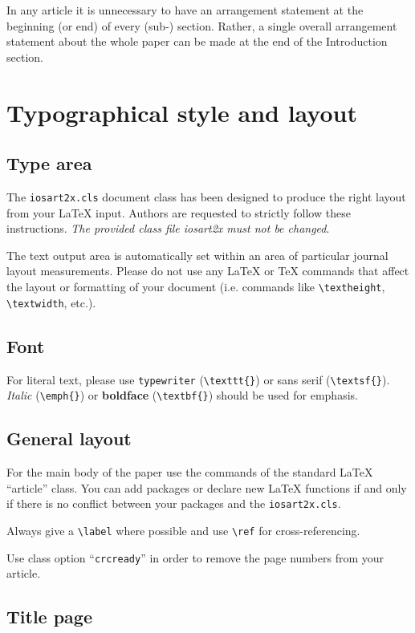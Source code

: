 \documentclass[ds]{iosart2x}
\begin{document}
In any article it is unnecessary to have an arrangement statement at the beginning (or end) of every \mbox{(sub-)} section.
Rather, a single overall arrangement statement about the whole paper can be made at the end of the Introduction section.


\section{Typographical style and layout}

\subsection{Type area}

The \texttt{iosart2x.cls} document class has been designed to produce
the right layout from your \LaTeX{} input. Authors are requested to
strictly follow these instructions. \emph{The provided class file
iosart2x must not be changed}.

The text output area is automatically set within an area of particular journal layout measurements.
Please do not use any
\LaTeX{} or \TeX{} commands that affect the layout or formatting of
your document (i.e. commands like \verb|\textheight|,
\verb|\textwidth|, etc.).

\subsection{Font}

For literal text, please use
\texttt{type\-writer} (\verb|\texttt{}|)
or \textsf{sans serif} (\verb|\textsf{}|). \emph{Italic} (\verb|\emph{}|)
or \textbf{boldface} (\verb|\textbf{}|) should be used for emphasis.


\subsection{General layout}

For the main
body of the paper use the commands of the standard \LaTeX{}
``article'' class. You can add packages or declare new \LaTeX{}
functions if and only if there is no conflict between your packages
and the \texttt{iosart2x.cls}.

Always give a \verb|\label| where possible and use \verb|\ref| for cross-referencing.

Use class option ``\texttt{crcready}'' in order to remove the page numbers from your article.


\subsection{Title page}
\end{document}
